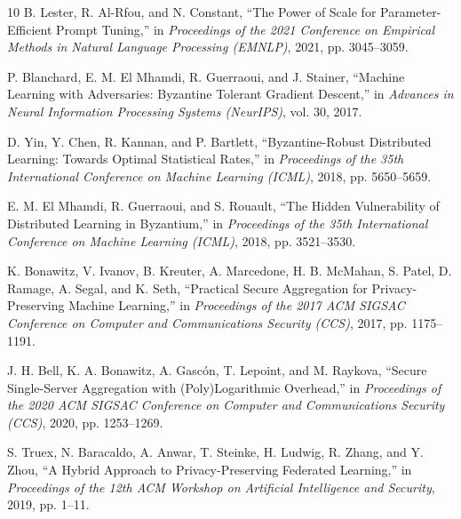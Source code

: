 \documentclass[conference]{IEEEtran}
\begin{document}
\begin{thebibliography}{10}
B. Lester, R. Al-Rfou, and N. Constant,
``The Power of Scale for Parameter-Efficient Prompt Tuning,''
in \textit{Proceedings of the 2021 Conference on Empirical Methods in Natural Language Processing (EMNLP)}, 2021, pp. 3045--3059.

P. Blanchard, E. M. El Mhamdi, R. Guerraoui, and J. Stainer,
``Machine Learning with Adversaries: Byzantine Tolerant Gradient Descent,''
in \textit{Advances in Neural Information Processing Systems (NeurIPS)}, vol. 30, 2017.

D. Yin, Y. Chen, R. Kannan, and P. Bartlett,
``Byzantine-Robust Distributed Learning: Towards Optimal Statistical Rates,''
in \textit{Proceedings of the 35th International Conference on Machine Learning (ICML)}, 2018, pp. 5650--5659.

E. M. El Mhamdi, R. Guerraoui, and S. Rouault,
``The Hidden Vulnerability of Distributed Learning in Byzantium,''
in \textit{Proceedings of the 35th International Conference on Machine Learning (ICML)}, 2018, pp. 3521--3530.

K. Bonawitz, V. Ivanov, B. Kreuter, A. Marcedone, H. B. McMahan, S. Patel, D. Ramage, A. Segal, and K. Seth,
``Practical Secure Aggregation for Privacy-Preserving Machine Learning,''
in \textit{Proceedings of the 2017 ACM SIGSAC Conference on Computer and Communications Security (CCS)}, 2017, pp. 1175--1191.

J. H. Bell, K. A. Bonawitz, A. Gascón, T. Lepoint, and M. Raykova,
``Secure Single-Server Aggregation with (Poly)Logarithmic Overhead,''
in \textit{Proceedings of the 2020 ACM SIGSAC Conference on Computer and Communications Security (CCS)}, 2020, pp. 1253--1269.

S. Truex, N. Baracaldo, A. Anwar, T. Steinke, H. Ludwig, R. Zhang, and Y. Zhou,
``A Hybrid Approach to Privacy-Preserving Federated Learning,''
in \textit{Proceedings of the 12th ACM Workshop on Artificial Intelligence and Security}, 2019, pp. 1--11.


\end{thebibliography}
\end{document}
